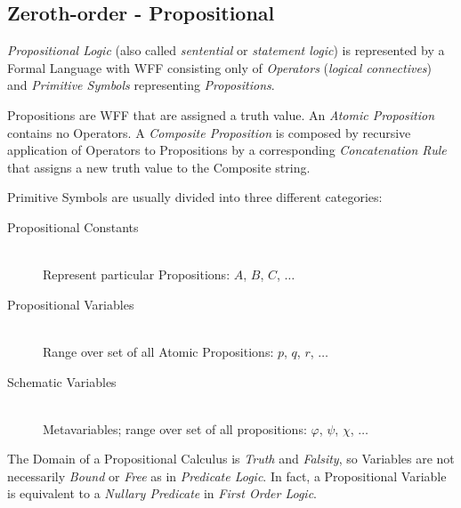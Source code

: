 \documentclass{article}
\begin{document}
\subsection{Zeroth-order - Propositional}

\emph{Propositional Logic} (also called \emph{sentential} or
\emph{statement logic}) is represented by a Formal Language with WFF
consisting only of \emph{Operators} (\emph{logical connectives}) and
\emph{Primitive Symbols} representing \emph{Propositions}.

Propositions are WFF that are assigned a truth value. An \emph{Atomic
  Proposition} contains no Operators. A \emph{Composite Proposition}
is composed by recursive application of Operators to Propositions by a
corresponding \emph{Concatenation Rule} that assigns a new truth value
to the Composite string.

Primitive Symbols are usually divided into three different categories:
\begin{description}
\item[Propositional Constants] \hfill \\
Represent particular Propositions: $A$, $B$, $C$, $\ldots$
\item[Propositional Variables] \hfill \\
Range over set of all Atomic Propositions: $p$, $q$, $r$, $\ldots$
\item[Schematic Variables] \hfill \\
Metavariables; range over set of all propositions: $\varphi$, $\psi$,
$\chi$, $\ldots$
\end{description}

The Domain of a Propositional Calculus is \emph{Truth} and
\emph{Falsity}, so Variables are not necessarily \emph{Bound} or
\emph{Free} as in \emph{Predicate Logic}. In fact, a Propositional
Variable is equivalent to a \emph{Nullary Predicate} in \emph{First
  Order Logic}.
\end{document}
